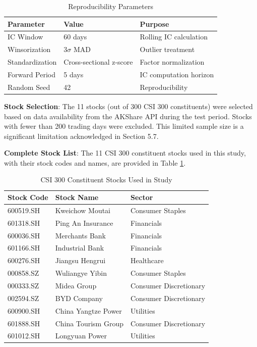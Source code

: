 \documentclass[12pt]{article}
\begin{document}
\begin{table}[h]
\centering
\caption{Reproducibility Parameters}
\begin{tabular}{lll}
\toprule
\textbf{Parameter} & \textbf{Value} & \textbf{Purpose} \\
\midrule
IC Window & 60 days & Rolling IC calculation \\
Winsorization & $3\sigma$ MAD & Outlier treatment \\
Standardization & Cross-sectional z-score & Factor normalization \\
Forward Period & 5 days & IC computation horizon \\
Random Seed & 42 & Reproducibility \\
\bottomrule
\end{tabular}
\end{table}

\textbf{Stock Selection}: The 11 stocks (out of 300 CSI 300 constituents) were selected based on data availability from the AKShare API during the test period. Stocks with fewer than 200 trading days were excluded. This limited sample size is a significant limitation acknowledged in Section 5.7.

\textbf{Complete Stock List}: The 11 CSI 300 constituent stocks used in this study, with their stock codes and names, are provided in Table \ref{tab:stocks}.

\begin{table}[h]
\centering
\caption{CSI 300 Constituent Stocks Used in Study}
\label{tab:stocks}
\begin{tabular}{lll}
\toprule
\textbf{Stock Code} & \textbf{Stock Name} & \textbf{Sector} \\
\midrule
600519.SH & Kweichow Moutai & Consumer Staples \\
601318.SH & Ping An Insurance & Financials \\
600036.SH & Merchants Bank & Financials \\
601166.SH & Industrial Bank & Financials \\
600276.SH & Jiangsu Hengrui & Healthcare \\
000858.SZ & Wuliangye Yibin & Consumer Staples \\
000333.SZ & Midea Group & Consumer Discretionary \\
002594.SZ & BYD Company & Consumer Discretionary \\
600900.SH & China Yangtze Power & Utilities \\
601888.SH & China Tourism Group & Consumer Discretionary \\
601012.SH & Longyuan Power & Utilities \\
\bottomrule
\end{tabular}
\end{table}
\end{document}
